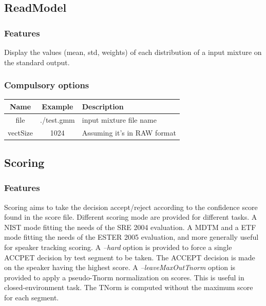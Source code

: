 \documentclass[a4paper]{article}
\begin{document}
\subsection{ReadModel}
\subsubsection{Features}
Display the values (mean, std, weights) of each distribution of a input mixture on the standard output.

\subsubsection{Compulsory options}

\begin{tabular}{|c|c||p{8cm}|}
\hline Name & Example & Description\\
\hline
\hline file & ./test.gmm & input mixture file name\\
\hline vectSize & 1024 & Assuming it's in RAW format\\
\hline
\end{tabular}

\subsection{Scoring}
\subsubsection{Features}
Scoring aims to take the decision accept/reject according to the confidence score found in the score file. Different scoring mode are provided for different tasks.
A NIST mode fitting the needs of the SRE 2004 evaluation.
A MDTM and a ETF mode fitting the needs of the ESTER 2005 evaluation, and more generally useful for speaker tracking scoring.
A \textit{--hard} option is provided to force a single ACCPET decision by test segment to be taken. The ACCEPT decision is made on the speaker having the highest score.
A \textit{--leaveMaxOutTnorm} option is provided to apply a pseudo-Tnorm normalization on scores. This is useful in closed-environment task. The TNorm is computed without the maximum score for each segment.
\end{document}
